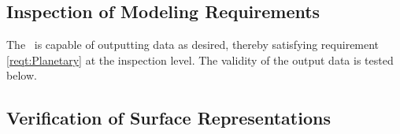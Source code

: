 %
%
% 
%


\label{ch:planetaryvv}

\subsection{Inspection of Modeling Requirements}

\label{inspect:Planetary}
 The \PlanetaryDesc\ is capable of outputting data as desired, thereby satisfying
 requirement \ref{reqt:Planetary} at the inspection level.  The validity of the output data is tested below.


\subsection{Verification of Surface Representations}

\label{test:Planetary}

